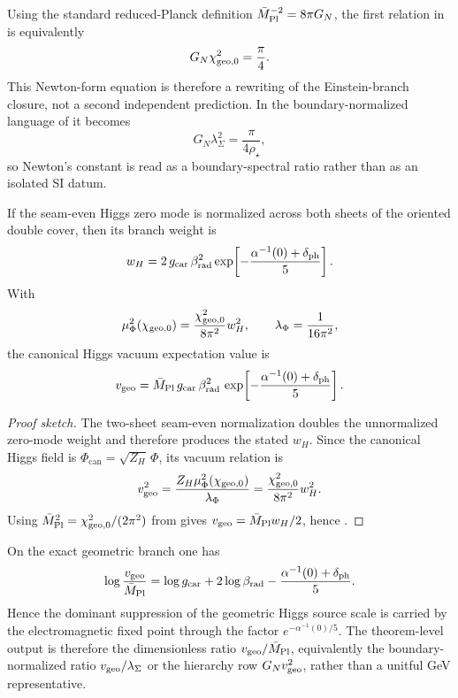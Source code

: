 \begin{remark}
Using the standard reduced-Planck definition $\bar M_{\mathrm{Pl}}^{-2}=8\pi G_N$, the first relation in  is equivalently
\[
G_N\chi_{\mathrm{geo},0}^2=\frac{\pi}{4}.
\]
This Newton-form equation is therefore a rewriting of the Einstein-branch closure, not a second
independent prediction. In the boundary-normalized language of
 it becomes
\[
G_N\lambda_\Sigma^2=\frac{\pi}{4\rho_\star},
\]
so Newton's constant is read as a boundary-spectral ratio rather than as an isolated SI datum.
\end{remark}

\begin{lemma}
\label{lem:two-sheet-zero-mode-normalization}
If the seam-even Higgs zero mode is normalized across both sheets of the oriented double cover, then its branch weight is
\[
w_H
=
2\,g_{\mathrm{car}}\,\beta_{\mathrm{rad}}^2
\exp\!\left[-\frac{\alpha^{-1}(0)+\delta_{\mathrm{ph}}}{5}\right].
\]
With
\[
\mu_\Phi^2(\chi_{\mathrm{geo},0})=\frac{\chi_{\mathrm{geo},0}^2}{8\pi^2}w_H^2,
\qquad
\lambda_\Phi=\frac{1}{16\pi^2},
\]
the canonical Higgs vacuum expectation value is
\begin{equation}
\label{eq:carrier-dressed-v}
v_{\mathrm{geo}}
=
\bar M_{\mathrm{Pl}}\,g_{\mathrm{car}}\,\beta_{\mathrm{rad}}^2\,
\exp\!\left[-\frac{\alpha^{-1}(0)+\delta_{\mathrm{ph}}}{5}\right].
\end{equation}
\end{lemma}

\begin{proof}[Proof sketch]
The two-sheet seam-even normalization doubles the unnormalized zero-mode weight and therefore produces the stated $w_H$. Since the canonical Higgs field is $\Phi_{\mathrm{can}}=\sqrt{Z_H}\,\Phi$, its vacuum relation is
\[
v_{\mathrm{geo}}^2=\frac{Z_H\mu_\Phi^2(\chi_{\mathrm{geo},0})}{\lambda_\Phi}
=
\frac{\chi_{\mathrm{geo},0}^2}{8\pi^2}w_H^2.
\]
Using $\bar M_{\mathrm{Pl}}^2=\chi_{\mathrm{geo},0}^2/(2\pi^2)$ from  gives $v_{\mathrm{geo}}=\bar M_{\mathrm{Pl}} w_H/2$, hence .
\end{proof}

\begin{corollary}
\label{cor:hierarchy-compression-vgeo}
On the exact geometric branch one has
\[
\log\frac{v_{\mathrm{geo}}}{\bar M_{\mathrm{Pl}}}
=
\log g_{\mathrm{car}}
+
2\log\beta_{\mathrm{rad}}
-
\frac{\alpha^{-1}(0)+\delta_{\mathrm{ph}}}{5}.
\]
Hence the dominant suppression of the geometric Higgs source scale is carried by the electromagnetic
fixed point through the factor $e^{-\alpha^{-1}(0)/5}$. The theorem-level output is therefore the
dimensionless ratio $v_{\mathrm{geo}}/\bar M_{\mathrm{Pl}}$, equivalently the boundary-normalized ratio $v_{\mathrm{geo}}/\lambda_\Sigma$
or the hierarchy row $G_Nv_{\mathrm{geo}}^2$, rather than a unitful GeV representative.
\end{corollary}

